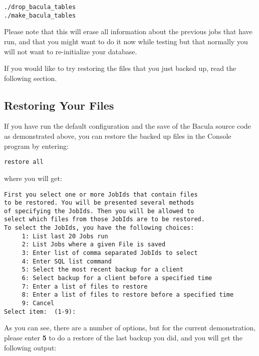 {{\footnotesize
\begin{verbatim}
./drop_bacula_tables
./make_bacula_tables
\end{verbatim}
\normalsize

Please note that this will erase all information about the previous jobs that
have run, and that you might want to do it now while testing but that normally
you will not want to re-initialize your database. 

If you would like to try restoring the files that you just backed up, read the
following section. 
\label{restoring}

\subsection*{Restoring Your Files}

If you have run the default configuration and the save of the Bacula source
code as demonstrated above, you can restore the backed up files in the Console
program by entering: 

\footnotesize
\begin{verbatim}
restore all
\end{verbatim}
\normalsize

where you will get: 

\footnotesize
\begin{verbatim}
First you select one or more JobIds that contain files
to be restored. You will be presented several methods
of specifying the JobIds. Then you will be allowed to
select which files from those JobIds are to be restored.
To select the JobIds, you have the following choices:
     1: List last 20 Jobs run
     2: List Jobs where a given File is saved
     3: Enter list of comma separated JobIds to select
     4: Enter SQL list command
     5: Select the most recent backup for a client
     6: Select backup for a client before a specified time
     7: Enter a list of files to restore
     8: Enter a list of files to restore before a specified time
     9: Cancel
Select item:  (1-9):
\end{verbatim}
\normalsize

As you can see, there are a number of options, but for the current
demonstration, please enter {\bf 5} to do a restore of the last backup you
did, and you will get the following output: 

}}
